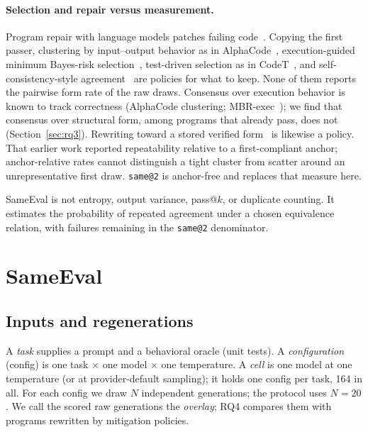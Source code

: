 \documentclass[acmsmall,screen,review,anonymous]{acmart}
\makeatletter
\newcommand{\sameeval}{SameEval}
\newcommand{\sameat}{\mbox{\texttt{same@2}}}
\makeatother
\begin{document}
\paragraph{Selection and repair versus measurement.}
Program repair with language models patches failing
code~\cite{xia2023apr}.
Copying the first passer, clustering by input--output behavior as in
AlphaCode~\cite{li2022alphacode}, execution-guided minimum Bayes-risk
selection~\cite{shi2022mbrexec}, test-driven selection as in
CodeT~\cite{chen2023codet}, and self-consistency-style
agreement~\cite{wang2023selfconsistency} are policies for what to keep.
None of them reports the pairwise form rate of the raw draws.
Consensus over execution behavior is known to track correctness
(AlphaCode clustering; MBR-exec~\cite{shi2022mbrexec}); we find that consensus
over structural form, among programs that already pass, does not
(Section~\ref{sec:rq3}).
Rewriting toward a stored verified form~\cite{roriz2026skytmsr} is likewise a
policy.
That earlier work reported repeatability relative to a first-compliant
anchor; anchor-relative rates cannot distinguish a tight cluster from scatter
around an unrepresentative first draw.
\sameat{} is anchor-free and replaces that measure here.

\sameeval{} is not entropy, output variance, pass@$k$, or duplicate counting.
It estimates the probability of repeated agreement under a chosen
equivalence relation, with failures remaining in the \sameat{} denominator.

\section{\sameeval{}}
\label{sec:protocol}

\subsection{Inputs and regenerations}
A \emph{task} supplies a prompt and a behavioral oracle (unit tests).
A \emph{configuration} (config) is one task $\times$ one model $\times$ one
temperature.
A \emph{cell} is one model at one temperature (or at provider-default
sampling); it holds one config per task, 164 in all.
For each config we draw $N$ independent generations; the protocol uses
$N{=}20$.
We call the scored raw generations the \emph{overlay}; RQ4 compares them with
programs rewritten by mitigation policies.
\end{document}

